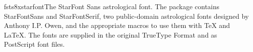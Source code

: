 \documentclass{ddltxtyp}
\begin{document}
\begin{package}{fsts8x}{starfont}{The StarFont Sans astrological font.}
The package contains StarFontSans and StarFontSerif, two
public-domain astrological fonts designed by Anthony I.P. Owen,
and the appropriate macros to use them with {\TeX} and {\LaTeX}. The
fonts are supplied in the original TrueType Format and as
PostScript font files.
\end{package}

\end{document}
